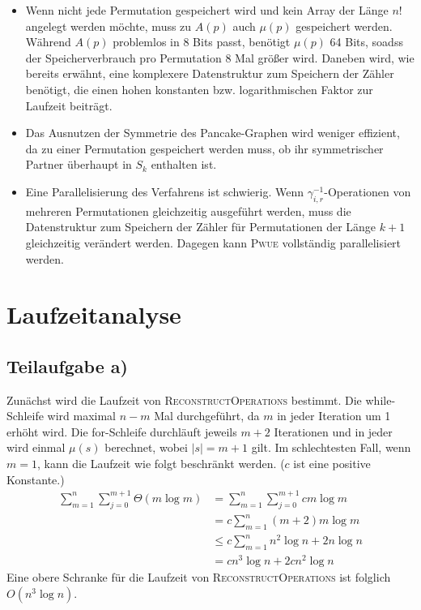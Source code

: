 \documentclass[a4paper, 10pt, ngerman]{article}
\begin{document}
\begin{itemize}
    \item Wenn nicht jede Permutation gespeichert wird und kein Array der Länge $n!$ angelegt werden möchte, muss zu $A(p)$ auch $\mu(p)$ gespeichert werden. Während $A(p)$ problemlos in 8 Bits passt, benötigt $\mu(p)$ 64 Bits, soadss der Speicherverbrauch pro Permutation 8 Mal größer wird. Daneben wird, wie bereits erwähnt, eine komplexere Datenstruktur zum Speichern der Zähler benötigt, die einen hohen konstanten bzw. logarithmischen Faktor zur Laufzeit beiträgt.
    \item Das Ausnutzen der Symmetrie des Pancake-Graphen wird weniger effizient, da zu einer Permutation gespeichert werden muss, ob ihr symmetrischer Partner überhaupt in $S_k$ enthalten ist.
    \item Eine Parallelisierung des Verfahrens ist schwierig. Wenn $\gamma_{i, r}^{-1}$-Operationen von mehreren Permutationen gleichzeitig ausgeführt werden, muss die Datenstruktur zum Speichern der Zähler für Permutationen der Länge $k + 1$ gleichzeitig verändert werden. Dagegen kann \textsc{Pwue} vollständig parallelisiert werden.
\end{itemize}

\section{Laufzeitanalyse}

\subsection{Teilaufgabe a)}

Zunächst wird die Laufzeit von \textsc{ReconstructOperations} bestimmt. Die while-Schleife wird maximal $n - m$ Mal durchgeführt, da $m$ in jeder Iteration um 1 erhöht wird. Die for-Schleife durchläuft jeweils $m + 2$ Iterationen und in jeder wird einmal $\mu(s)$ berechnet, wobei $|s| = m+1$ gilt. Im schlechtesten Fall, wenn $m = 1$, kann die Laufzeit wie folgt beschränkt werden. ($c$ ist eine positive Konstante.)
\begin{align*}
    \sum_{m = 1}^n \sum_{j = 0}^{m+1} \Theta(m \log m)
     & = \sum_{m = 1}^n \sum_{j = 0}^{m+1} cm \log m \\
     & = c \sum_{m = 1}^n (m + 2)m \log m            \\
     & \le c \sum_{m = 1}^n n^2 \log n  + 2 n \log n \\
     & = cn^3 \log n + 2cn^2 \log n                 
\end{align*}
Eine obere Schranke für die Laufzeit von \textsc{ReconstructOperations} ist folglich $O(n^3 \log n)$.
\end{document}
